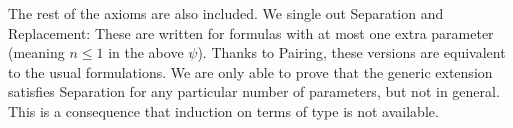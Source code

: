 The rest of the axioms are also
included. We single out Separation and Replacement: These are written
for formulas with at most one extra parameter (meaning $n\leq 1$ in the
above $\psi$). Thanks to Pairing, these
versions are equivalent to the usual formulations. We are only able to
prove that the generic extension satisfies Separation for any particular
number of parameters, but not in general. This is a consequence that
induction on terms of type \tyo{} is not available.


%

